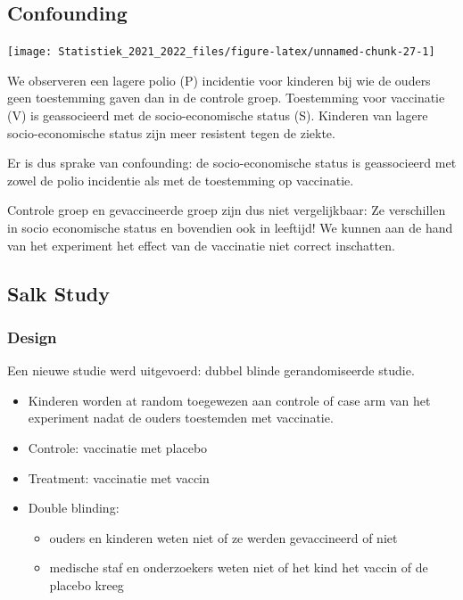 \documentclass[
  12pt,dutch,coursenotes]{book}
\providecommand{\tightlist}{%
  \setlength{\itemsep}{0pt}\setlength{\parskip}{0pt}}
\theoremstyle{definition}
\theoremstyle{definition}
\theoremstyle{definition}
\theoremstyle{definition}
\theoremstyle{remark}
\begin{document}
\hypertarget{confounding}{%
\subsection{Confounding}\label{confounding}}

\begin{center}\texttt{[image: Statistiek\_2021\_2022\_files/figure-latex/unnamed-chunk-27-1]} \end{center}

We observeren een lagere polio (P) incidentie voor kinderen bij wie de ouders geen toestemming gaven dan in de controle groep.
Toestemming voor vaccinatie (V) is geassocieerd met de socio-economische status (S).
Kinderen van lagere socio-economische status zijn meer resistent tegen de ziekte.

Er is dus sprake van confounding: de socio-economische status is geassocieerd met zowel de polio incidentie als met de toestemming op vaccinatie.

Controle groep en gevaccineerde groep zijn dus niet vergelijkbaar:
Ze verschillen in socio economische status en bovendien ook in leeftijd!
We kunnen aan de hand van het experiment het effect van de vaccinatie niet correct inschatten.

\hypertarget{salk-study}{%
\subsection{Salk Study}\label{salk-study}}

\hypertarget{design-1}{%
\subsubsection{Design}\label{design-1}}

Een nieuwe studie werd uitgevoerd: dubbel blinde gerandomiseerde studie.

\begin{itemize}
\tightlist
\item
  Kinderen worden at random toegewezen aan controle of case arm van het experiment nadat de ouders toestemden met vaccinatie.
\item
  Controle: vaccinatie met placebo
\item
  Treatment: vaccinatie met vaccin
\item
  Double blinding:

  \begin{itemize}
  \tightlist
  \item
    ouders en kinderen weten niet of ze werden gevaccineerd of niet
  \item
    medische staf en onderzoekers weten niet of het kind het vaccin of de placebo kreeg
  \end{itemize}
\end{itemize}
\end{document}

